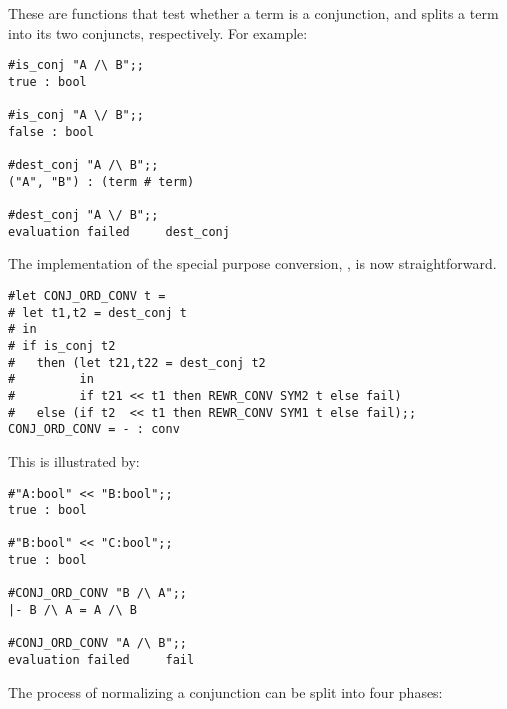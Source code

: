 \noindent These are functions that test whether a term is a conjunction, and
splits a term into its two conjuncts, respectively. For example:

\begin{session}\begin{verbatim}
#is_conj "A /\ B";;
true : bool

#is_conj "A \/ B";;
false : bool

#dest_conj "A /\ B";;
("A", "B") : (term # term)

#dest_conj "A \/ B";;
evaluation failed     dest_conj
\end{verbatim}\end{session}

The implementation of the special purpose conversion, 
, is now straightforward.


\begin{session}\begin{verbatim}
#let CONJ_ORD_CONV t =
# let t1,t2 = dest_conj t
# in
# if is_conj t2
#   then (let t21,t22 = dest_conj t2
#         in
#         if t21 << t1 then REWR_CONV SYM2 t else fail)
#   else (if t2  << t1 then REWR_CONV SYM1 t else fail);;
CONJ_ORD_CONV = - : conv
\end{verbatim}\end{session}

\noindent This is illustrated by:

\begin{session}\begin{verbatim}
#"A:bool" << "B:bool";;
true : bool

#"B:bool" << "C:bool";;
true : bool

#CONJ_ORD_CONV "B /\ A";;
|- B /\ A = A /\ B

#CONJ_ORD_CONV "A /\ B";;
evaluation failed     fail
\end{verbatim}\end{session}

The process of normalizing a conjunction can be split into four phases:



